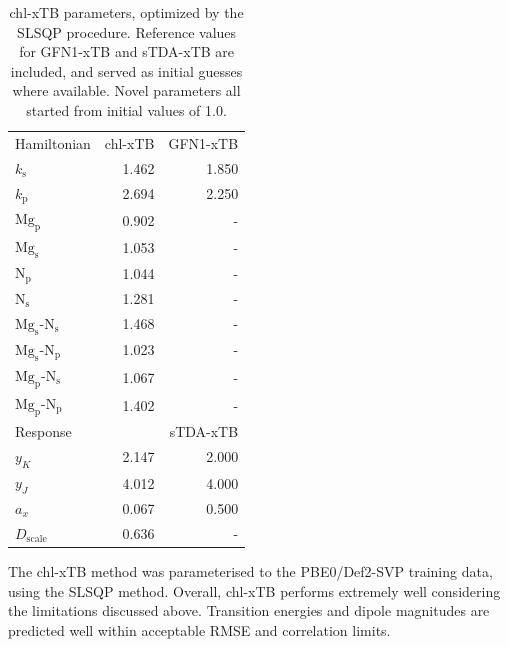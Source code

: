 \begin{table}
    \centering
    \begin{tabular}{|| l r | r ||}
    \hline
    Hamiltonian & chl-xTB & GFN1-xTB \\
    $k_\text{s}$ & 1.462 & 1.850 \\
    $k_\text{p}$ & 2.694 & 2.250 \\

    $\text{Mg}_\text{p}$ & 0.902 & - \\
    $\text{Mg}_\text{s}$ & 1.053 & - \\
    $\text{N}_\text{p}$ & 1.044 & - \\
    $\text{N}_\text{s}$ & 1.281 & - \\

    $\text{Mg}_\text{s}$-$\text{N}_\text{s}$ & 1.468 & - \\
    $\text{Mg}_\text{s}$-$\text{N}_\text{p}$ & 1.023 & - \\
    $\text{Mg}_\text{p}$-$\text{N}_\text{s}$ & 1.067 & - \\
    $\text{Mg}_\text{p}$-$\text{N}_\text{p}$ & 1.402 & - \\

    \hline\hline
    Response & & sTDA-xTB\\
    $y_K$ & 2.147 & 2.000 \\
    $y_J$ & 4.012 & 4.000 \\
    $a_x$ & 0.067 & 0.500 \\
    $D_{\text{scale}}$ & 0.636 & - \\
    \hline
    \end{tabular}
    \caption{chl-xTB parameters, optimized by the SLSQP procedure. Reference values
    for GFN1-xTB and sTDA-xTB are included, and served as initial guesses where 
    available. Novel parameters all started from initial values of 1.0.}
    \label{table:chl_params}
\end{table}

The chl-xTB method was parameterised to the PBE0/Def2-SVP training data, using 
the SLSQP method. Overall, chl-xTB performs extremely well considering the limitations
discussed above. Transition energies and dipole magnitudes are predicted well within
acceptable RMSE and correlation limits.

